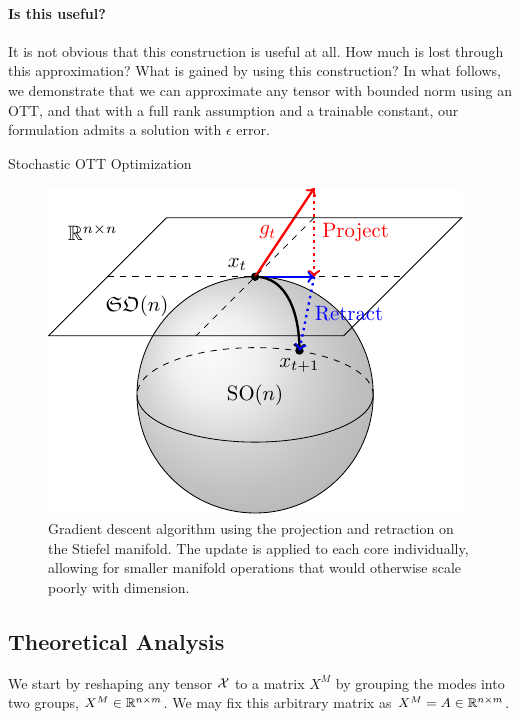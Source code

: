 \paragraph{Is this useful?} It is not obvious that this construction is useful at all. How much is lost through this approximation? What is gained by using this construction? In what follows, we demonstrate that we can approximate any tensor with bounded norm using an OTT, and that with a full rank assumption and a trainable constant, our formulation admits a solution with $\epsilon$ error.
\begin{algorithm}
	\caption{Stochastic OTT Optimization}\label{alg:ott_opt}
	\SetAlgoLined
	\DontPrintSemicolon
\end{algorithm}
\begin{figure}
	\centering
	\includegraphics[width=0.75\columnwidth,trim={0 1.5cm 0 0},clip]{4_ott/figs/stiefel/stiefel_update.pdf}
	\caption{\label{fig:ott_opt} Gradient descent algorithm using the projection and retraction on the Stiefel manifold. The update is applied to each core individually, allowing for smaller manifold operations that would otherwise scale poorly with dimension.}
\end{figure}

\subsection{Theoretical Analysis}
We start by reshaping any tensor $\mathcal{X}$ to a matrix $X^M$ by grouping the modes into two groups, $X^M \in \mathbb{R}^{n \times m}$. We may fix this arbitrary matrix as $X^M = A \in \mathbb{R}^{n \times m}$.

